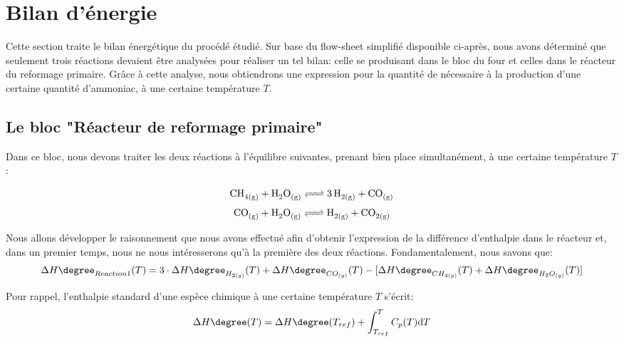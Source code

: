 
\section{Bilan d'énergie}

Cette section traite le bilan énergétique du procédé étudié.
Sur base du flow-sheet simplifié disponible ci-après, nous avons déterminé que seulement trois réactions
devaient être analysées pour réaliser un tel bilan: celle se produisant dans le bloc du four et celles dans 
le réacteur du reformage primaire. Grâce à cette analyse, nous obtiendrons une expression pour la
quantité de  nécessaire à la production d'une certaine quantité d'ammoniac, à une certaine température $T$.

\subsection{Le bloc "Réacteur de reformage primaire"}

Dans ce bloc, nous devons traiter les deux réactions à l'équilibre suivantes, prenant
bien place simultanément, à une certaine température $T$:

\begin{equation}\label{eq:Reaction1}
\ce{CH_{4(g)} + H_{2}O_{(g)} <=> 3H_{2(g)} + CO_{(g)}}
\end{equation}
\begin{equation}\label{eq:Reaction2} {\ce{CO_{(g)} + H_{2}O_{(g)} <=>  H_{2(g)} + CO_{2(g)}}}
\end{equation}


\bigbreak
Nous allons développer le raisonnement que nous avons effectué afin d'obtenir l'expression de la différence
d'enthalpie dans le réacteur et, dans un premier temps, nous ne nous intéresserons qu'à la première des
deux réactions. Fondamentalement, nous savons que:
$$\Delta H\degree_{Reaction1}(T)=3 \cdot \Delta H\degree_{H_{2(g)}}(T) + \Delta H\degree_{CO_{(g)}}(T) -
\lbrack\Delta H\degree_{CH_{4(g)}}(T) + \Delta H\degree_{H_{2}O_{(g)}}(T)\rbrack$$

Pour rappel, l'enthalpie standard d'une espèce chimique à une certaine température $T$ s'écrit: \begin{equation}\label{eq:deltaH}
\Delta H\degree(T)=\Delta H\degree(T_{ref})  + \displaystyle \int_{T_{ref}}^{T} C_{p}(T) \mathrm{d}T
\end{equation}


